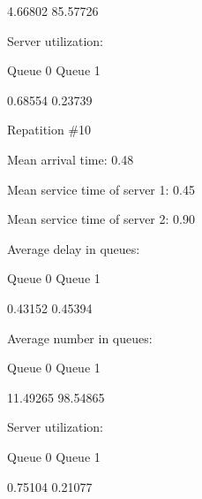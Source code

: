 \documentclass{article}
\begin{document}
4.66802		85.57726		



Server utilization:

Queue 0		Queue 1		



0.68554		0.23739		



 Repatition \#10

Mean arrival time: 0.48

Mean service time of server 1: 0.45

Mean service time of server 2: 0.90



Average delay in queues:

Queue 0		Queue 1		



0.43152		0.45394		



Average number in queues:

Queue 0		Queue 1		



11.49265		98.54865		



Server utilization:

Queue 0		Queue 1		



0.75104		0.21077		



 
\end{document}
